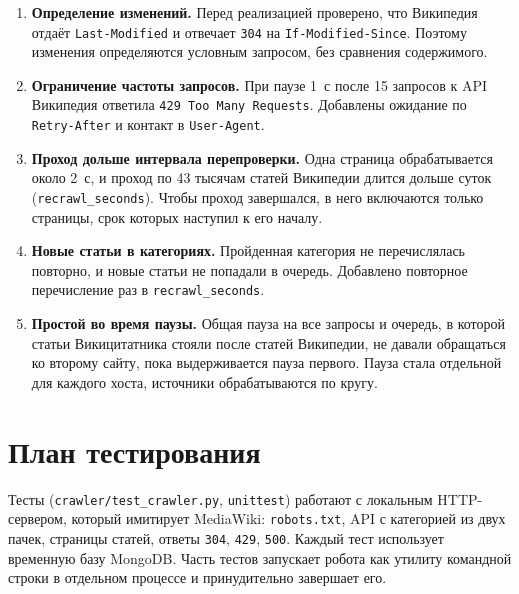 \documentclass[12pt,a4paper,oneside,fleqn]{article}
\begin{document}
\begin{enumerate}
    \item \textbf{Определение изменений.} Перед реализацией проверено, что Википедия отдаёт \texttt{Last-Modified} и отвечает \texttt{304} на \texttt{If-Modified-Since}. Поэтому изменения определяются условным запросом, без сравнения содержимого.

    \item \textbf{Ограничение частоты запросов.} При паузе 1~с после 15 запросов к API Википедия ответила \texttt{429 Too Many Requests}. Добавлены ожидание по \texttt{Retry-After} и контакт в \texttt{User-Agent}.

    \item \textbf{Проход дольше интервала перепроверки.} Одна страница обрабатывается около 2~с, и проход по 43 тысячам статей Википедии длится дольше суток (\texttt{recrawl\_seconds}). Чтобы проход завершался, в него включаются только страницы, срок которых наступил к его началу.

    \item \textbf{Новые статьи в категориях.} Пройденная категория не перечислялась повторно, и новые статьи не попадали в очередь. Добавлено повторное перечисление раз в \texttt{recrawl\_seconds}.

    \item \textbf{Простой во время паузы.} Общая пауза на все запросы и очередь, в которой статьи Викицитатника стояли после статей Википедии, не давали обращаться ко второму сайту, пока выдерживается пауза первого. Пауза стала отдельной для каждого хоста, источники обрабатываются по кругу.
\end{enumerate}

\pagebreak

\section{План тестирования}

Тесты (\texttt{crawler/test\_crawler.py}, \texttt{unittest}) работают с локальным HTTP-сервером, который имитирует MediaWiki: \texttt{robots.txt}, API с категорией из двух пачек, страницы статей, ответы \texttt{304}, \texttt{429}, \texttt{500}. Каждый тест использует временную базу MongoDB. Часть тестов запускает робота как утилиту командной строки в отдельном процессе и принудительно завершает его.
\end{document}
